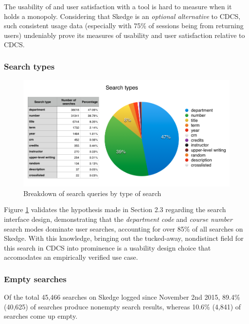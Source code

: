 The usability of and user satisfaction with a tool is hard to measure when it holds a monopoly. Considering that Skedge is an \emph{optional alternative} to CDCS, such consistent usage data (especially with 75\% of sessions being from returning users) undeniably prove its measures of usability and user satisfaction relative to CDCS.


  \subsubsection{Search types}

  \begin{figure}[H]
    \centering
    \includegraphics[width=1.0\textwidth]{images/graph/searchtypes}

    \caption{Breakdown of search queries by type of search}
    \label{fig:searchtypes}
  \end{figure}


Figure \ref{fig:searchtypes} validates the hypothesis made in Section 2.3 regarding the search interface design, demonstrating that the \emph{department code} and \emph{course number} search modes dominate user searches, accounting for over 85\% of all searches on Skedge. With this knowledge, bringing out the tucked-away, nondistinct field for this search in CDCS into prominence is a usability design choice that accomodates an empirically verified use case.

\subsubsection{Empty searches}

  Of the total 45,466 searches on Skedge logged since November 2nd 2015, 89.4\% (40,625) of searches produce nonempty search results, whereas 10.6\% (4,841) of searches come up empty.

